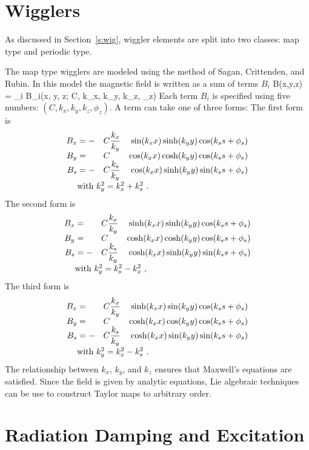\section{Wigglers}
\label{s:wiggler_phys}

As discussed in Section~\ref{s:wig}, \bmad wiggler elements are split into 
two classes: map type and periodic type.


The map type wigglers are modeled using the method of Sagan, Crittenden, 
and Rubin\cite{b:scr}. In this model the magnetic field is written as 
a sum of terms $B_i$
\Begineq
  B(x,y,z) = \sum_i B_i(x, y, z; C, k_x, k_y, k_z, \phi_z)
\Endeq 
Each term $B_i$ is specified using five numbers: 
$(C, k_x, k_y, k_z, \phi_z)$. A term can take one of three forms: The first
form is
\begin{alignat}{4}
  B_x &= -&C &\dfrac{k_x}{k_y} & \sin(\kxx) \sinh(\kyy) \cos(\ksss) \CRNEG
  B_y &=  &C &                 & \cos(\kxx) \cosh(\kyy) \cos(\ksss) \CRNEG
  B_s &= -&C &\dfrac{k_s}{k_y} & \cos(\kxx) \sinh(\kyy) \sin(\ksss) \CRneg
  & \makebox[1pt][l]{with $k_y^2 = k_x^2 + k_s^2$ .} &&&  \label{f1}
\end{alignat}
The second form is
\begin{alignat}{4}
  B_x &=  &C &\dfrac{k_x}{k_y} & \sinh(\kxx) \sinh(\kyy) \cos(\ksss) \CRNEG
  B_y &=  &C &                 & \cosh(\kxx) \cosh(\kyy) \cos(\ksss) \CRNEG
  B_s &= -&C &\dfrac{k_s}{k_y} & \cosh(\kxx) \sinh(\kyy) \sin(\ksss) \CRneg
  & \makebox[1pt][l]{with $k_y^2 = k_s^2 - k_x^2$ ,} &&&  \label{f2}
\end{alignat}
The third form is
\begin{alignat}{4}
  B_x &=  &C &\dfrac{k_x}{k_y} & \sinh(\kxx) \sin(\kyy) \cos(\ksss) \CRNEG
  B_y &=  &C &                 & \cosh(\kxx) \cos(\kyy) \cos(\ksss) \CRNEG
  B_s &= -&C &\dfrac{k_s}{k_y} & \cosh(\kxx) \sin(\kyy) \sin(\ksss) \CRneg
  & \makebox[1pt][l]{with $k_y^2 = k_x^2 - k_s^2$ .} &&& \label{f3}
\end{alignat}
The relationship between $k_x$, $k_y$, and $k_z$ ensures that Maxwell's equations
are satisfied. Since the field is given by analytic equations, Lie algebraic
techniques can be use to construct Taylor maps to arbitrary order.

\section{Radiation Damping and Excitation}
\label{s:radiation}

